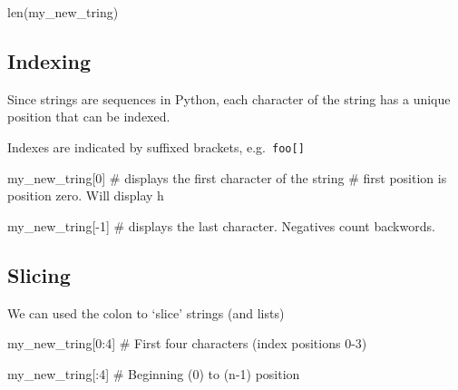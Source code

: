 \documentclass[
  letterpaper,
  DIV=11,
  numbers=noendperiod]{scrreprt}
\newenvironment{Shaded}{\begin{snugshade}}{\end{snugshade}}
\newcommand{\BuiltInTok}[1]{\textcolor[rgb]{0.00,0.23,0.31}{#1}}
\newcommand{\CommentTok}[1]{\textcolor[rgb]{0.37,0.37,0.37}{#1}}
\newcommand{\DecValTok}[1]{\textcolor[rgb]{0.68,0.00,0.00}{#1}}
\newcommand{\NormalTok}[1]{\textcolor[rgb]{0.00,0.23,0.31}{#1}}
\newcommand{\OperatorTok}[1]{\textcolor[rgb]{0.37,0.37,0.37}{#1}}
\begin{document}
\begin{Shaded}
\begin{Highlighting}[]
\BuiltInTok{len}\NormalTok{(my\_new\_tring)}
\end{Highlighting}
\end{Shaded}

\hypertarget{indexing}{%
\subsection{Indexing}\label{indexing}}

Since strings are sequences in Python, each character of the string has
a unique position that can be indexed.

Indexes are indicated by suffixed brackets, e.g.~\texttt{foo{[}{]}}

\begin{Shaded}
\begin{Highlighting}[]
\NormalTok{my\_new\_tring[}\DecValTok{0}\NormalTok{] }\CommentTok{\# displays the first character of the string}
            \CommentTok{\# first position is position zero. Will display \textquotesingle{}h\textquotesingle{}}
\end{Highlighting}
\end{Shaded}

\begin{Shaded}
\begin{Highlighting}[]
\NormalTok{my\_new\_tring[}\OperatorTok{{-}}\DecValTok{1}\NormalTok{] }\CommentTok{\# displays the last character. Negatives count backwords.}
\end{Highlighting}
\end{Shaded}

\hypertarget{slicing}{%
\subsection{Slicing}\label{slicing}}

We can used the colon to `slice' strings (and lists)

\begin{Shaded}
\begin{Highlighting}[]
\NormalTok{my\_new\_tring[}\DecValTok{0}\NormalTok{:}\DecValTok{4}\NormalTok{] }\CommentTok{\# First four characters (index positions 0{-}3)}
\end{Highlighting}
\end{Shaded}

\begin{Shaded}
\begin{Highlighting}[]
\NormalTok{my\_new\_tring[:}\DecValTok{4}\NormalTok{]  }\CommentTok{\# Beginning (0) to (n{-}1) position}
\end{Highlighting}
\end{Shaded}
\end{document}
